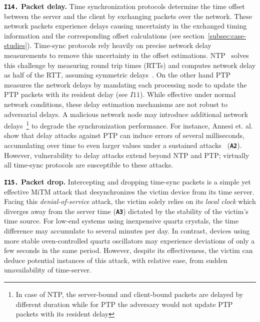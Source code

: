 \noindent\textbf{\texttt{I14.} Packet delay.} Time synchronization protocols determine the time offset between the server and the client by exchanging packets over the network. These network packets experience delays causing uncertainty in the exchanged timing information and the corresponding offset calculations (see section~\ref{subsec:case-studies}). Time-sync protocols rely heavily on precise network delay measurements to remove this uncertainty in the offset estimations. NTP~\cite{ntpv4-rfc} solves this challenge by measuring round trip times (RTTs) and computes network delay as half of the RTT, assuming symmetric delays~\cite{rfc1305}. On the other hand PTP measures the network delays by mandating each processing node to update the PTP packets with its resident delay (see $I11$). While effective under normal network conditions, these delay estimation mechanisms are not robust to adversarial delays. A malicious network node may introduce additional network delays~\footnote{In case of NTP, the server-bound and client-bound packets are delayed by different duration while for PTP the adversary would not update PTP packets with its resident delay} to degrade the synchronization performance. For instance, Annesi et. al. show that delay attacks against PTP can induce errors of several milliseconds, accumulating over time to even larger values under a sustained attacks~\cite{ptp-futile-encryption} (\textbf{\texttt{A2}}). However, vulnerability to delay attacks extend beyond NTP and PTP; virtually all time-sync protocols are susceptible to these attacks.

\noindent\textbf{\texttt{I15.} Packet drop.} 
Intercepting and dropping time-sync packets is a simple yet effective MiTM attack that desynchronizes the victim device from its time server. Facing this \textit{denial-of-service} attack, the victim solely relies on its \textit{local clock} which diverges away from the server time (\textbf{\texttt{A3}}) dictated by the stability of the victim's time source. For low-end systems using inexpensive quartz crystals, the time difference may accumulate to several minutes per day. In contrast, devices using more stable oven-controlled quartz oscillators may experience deviations of only a few seconds in the same period. However, despite its effectiveness, the victim can deduce potential instances of this attack, with relative ease, from sudden unavailability of time-server.

